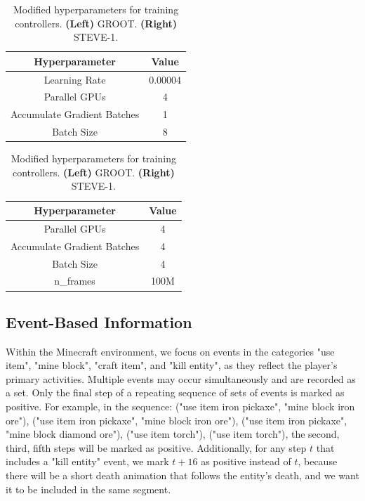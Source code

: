 \begin{table}[!ht]
\parbox{.5\linewidth}{
    \centering
    \renewcommand{\arraystretch}{1.2}
    \begin{tabular}{@{}cc@{}}
    \toprule
    Hyperparameter & Value  \\ \midrule
    Learning Rate & 0.00004 \\
    Parallel GPUs & 4   \\
    Accumulate Gradient Batches  & 1    \\
    Batch Size & 8  \\
    \bottomrule
    \end{tabular}
}
\parbox{.5\linewidth}{
    \centering
    \renewcommand{\arraystretch}{1.2}
    \begin{tabular}{@{}cc@{}}
    \toprule
    Hyperparameter & Value  \\ \midrule
    Parallel GPUs & 4   \\
    Accumulate Gradient Batches  & 4    \\
    Batch Size & 4  \\
    n\_frames & 100M \\
    \bottomrule
    \end{tabular}
}
\label{tab:hyper}
\caption{Modified hyperparameters for training controllers. 
\textbf{(Left)} GROOT.
\textbf{(Right)} STEVE-1.}
\end{table}

\subsection{Event-Based Information}
\label{app: event}
Within the Minecraft environment, we focus on events in the categories "use item", "mine block", "craft item", and "kill entity", as they reflect the player's primary activities. Multiple events may occur simultaneously and are recorded as a set. Only the final step of a repeating sequence of sets of events is marked as positive. For example, in the sequence: ("use item iron pickaxe", "mine block iron ore"), ("use item iron pickaxe", "mine block iron ore"), ("use item iron pickaxe", "mine block diamond ore"), ("use item torch"), ("use item torch"), the second, third, fifth steps will be marked as positive. Additionally, for any step $t$ that includes a "kill entity" event, we mark $t+16$ as positive instead of $t$, because there will be a short death animation that follows the entity’s death, and we want it to be included in the same segment.

